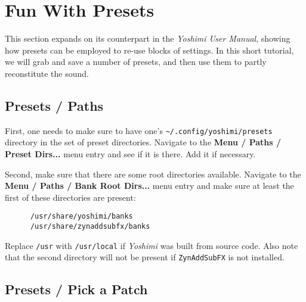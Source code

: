 %
%
%

\section{Fun With Presets}
\label{sec:presets}

   This section expands on its counterpart in the  \textsl{Yoshimi User Manual},
   showing how presets can be employed to re-use blocks of settings.
   In this short tutorial, we will grab and save a number of presets,
   and then use them to partly reconstitute the sound.

\subsection{Presets / Paths}
\label{subsec:presets_paths}

   First, one needs to make sure to have one's
   \texttt{\textasciitilde/.config/yoshimi/presets} directory
   in the set of preset directories.
   Navigate to the \textbf{Menu / Paths / Preset Dirs...} menu entry
   and see if it is there.
   Add it if necessary.

   Second, make sure that there are some root directories available.
   Navigate to the \textbf{Menu / Paths / Bank Root Dirs...} menu entry
   and make sure at least the first of these directories are present:

   \begin{verbatim}
      /usr/share/yoshimi/banks
      /usr/share/zynaddsubfx/banks
   \end{verbatim}

   Replace \texttt{/usr} with \texttt{/usr/local} if \textsl{Yoshimi}
   was built from source code.  Also note that the second directory will not
   be present if \texttt{ZynAddSubFX} is not installed.

\subsection{Presets / Pick a Patch}
\label{subsec:presets_pick_a_patch}

